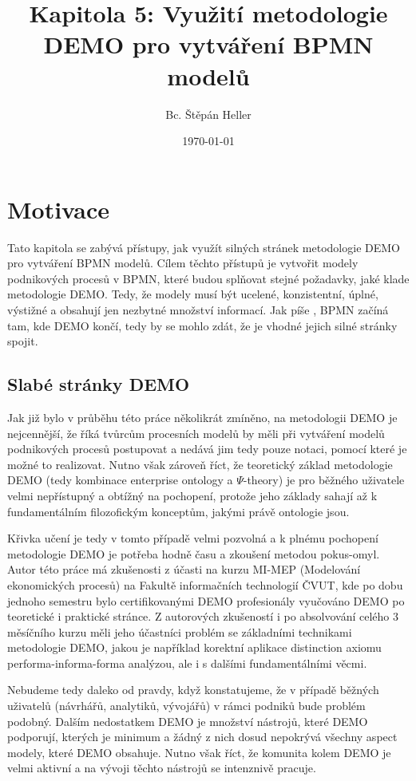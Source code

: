 \documentclass[]{article}
\newcommand{\ptheory}{$\Psi$-theory}
\begin{document}
\title{Kapitola 5: Využití metodologie DEMO pro vytváření BPMN modelů}
\author{Bc. Štěpán Heller}
\date{\today}
\maketitle

\section{Motivace}
Tato kapitola se zabývá přístupy, jak využít silných stránek metodologie DEMO pro vytváření BPMN modelů. Cílem těchto přístupů je vytvořit modely podnikových procesů v BPMN, které budou splňovat stejné požadavky, jaké klade metodologie DEMO. Tedy, že modely musí být ucelené, konzistentní, úplné, výstižné a obsahují jen nezbytné množství informací. Jak píše \cite{VanNuffel2009}, BPMN začíná tam, kde DEMO končí, tedy by se mohlo zdát, že je vhodné jejich silné stránky spojit.

\subsection{Slabé stránky DEMO}
Jak již bylo v průběhu této práce několikrát zmíněno, na metodologii DEMO je nejcennější, že říká tvůrcům procesních modelů  by měli při vytváření modelů podnikových procesů postupovat a nedává jim tedy pouze notaci, pomocí které je možné to realizovat. Nutno však zároveň říct, že teoretický základ metodologie DEMO (tedy kombinace enterprise ontology a \ptheory) je pro běžného uživatele velmi nepřístupný a obtížný na pochopení, protože jeho základy sahají až k fundamentálním filozofickým konceptům, jakými právě ontologie jsou. 

Křivka učení je tedy v tomto případě velmi pozvolná a k plnému pochopení metodologie DEMO je potřeba hodně času a zkoušení metodou pokus-omyl. Autor této práce má zkušenosti z účasti na kurzu MI-MEP (Modelování ekonomických procesů) na Fakultě informačních technologií ČVUT, kde po dobu jednoho semestru bylo certifikovanými DEMO profesionály vyučováno DEMO po teoretické i praktické stránce. Z autorových zkušeností i po absolvování celého 3 měsíčního kurzu měli jeho účastníci problém se základními technikami metodologie DEMO, jakou je například korektní aplikace distinction axiomu performa-informa-forma analýzou, ale i s dalšími fundamentálními věcmi.

Nebudeme tedy daleko od pravdy, když konstatujeme, že v případě běžných uživatelů (návrhářů, analytiků, vývojářů) v rámci podniků bude problém podobný. Dalším nedostatkem DEMO je množství nástrojů, které DEMO podporují, kterých je minimum a žádný z nich dosud nepokrývá všechny aspect modely, které DEMO obsahuje. Nutno však říct, že komunita kolem DEMO je velmi aktivní a na vývoji těchto nástrojů se intenznivě pracuje.
\end{document}
